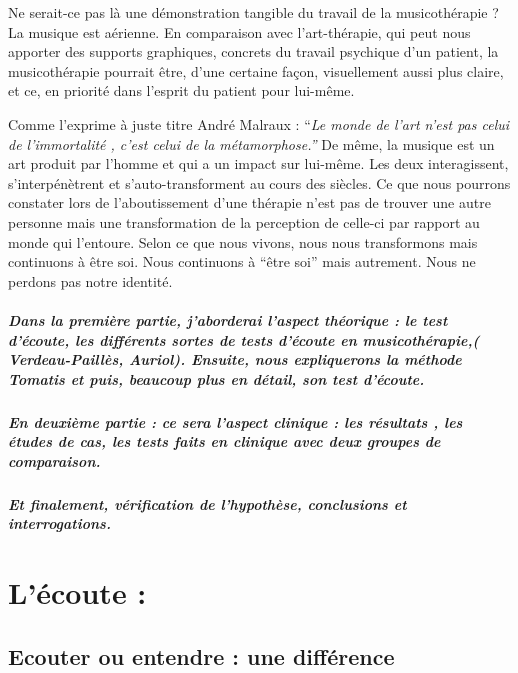 \documentclass[12pt,french]{report}
\begin{document}
Ne serait-ce pas là une démonstration tangible du travail de la musicothérapie
? La musique est aérienne. En comparaison avec l'art-thérapie, qui
peut nous apporter des supports graphiques, concrets du travail psychique
d'un patient, la musicothérapie pourrait être, d'une certaine façon,
visuellement aussi plus claire, et ce, en priorité dans l'esprit du
patient pour lui-même. 

Comme l'exprime à juste titre André Malraux : ``\emph{Le monde de
l'art n'est pas celui de l'immortalité , c'est celui de la métamorphose.''}
De même, la musique est un art produit par l'homme et qui a un impact
sur lui-même. Les deux interagissent, s'interpénètrent et s'auto-transforment
au cours des siècles. Ce que nous pourrons constater lors de l'aboutissement
d'une thérapie n'est pas de trouver une autre personne mais une transformation
de la perception de celle-ci par rapport au monde qui l'entoure. Selon
ce que nous vivons, nous nous transformons mais continuons à être
soi. Nous continuons à ``être soi'' mais autrement. Nous ne perdons
pas notre identité.

\paragraph{Dans la première partie, j'aborderai l'aspect théorique : le test
d'écoute, les différents sortes de tests d'écoute en musicothérapie,(
Verdeau-Paillès, Auriol). Ensuite, nous expliquerons la méthode Tomatis
et puis, beaucoup plus en détail, son test d'écoute. }

\paragraph{En deuxième partie : ce sera l'aspect clinique : les résultats ,
les études de cas, les tests faits en clinique avec deux groupes de
comparaison.}

\paragraph{Et finalement, vérification de l'hypothèse, conclusions et interrogations.}

\chapter{L'écoute :}

\section{Ecouter ou entendre : une différence}
\end{document}
